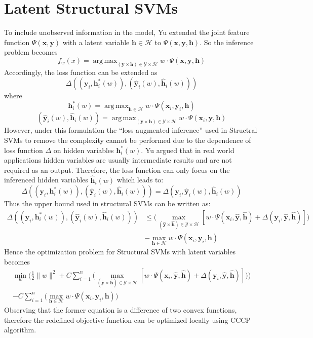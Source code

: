 \documentclass{article}
\DeclareMathOperator*{\argmax}{arg\,max}
\begin{document}
	\section{Latent Structural SVMs}
		To include unobserved information in the model, Yu\cite{yu2009learning} extended the joint feature function\cite{tsochantaridis2005large}  $\Psi(\mathbf{x},\mathbf{y}) $ with a latent variable $\mathbf{h}\in \mathcal{H}$ to $\Psi(\mathbf{x},\mathbf{y},\mathbf{h}) $. So the inference problem becomes
		$$
		f_w(x) = \argmax_{(\mathbf{y} \times \mathbf{h}) \in \mathcal{Y} \times \mathcal{H}} w\cdot\Psi(\mathbf{x},\mathbf{y},\mathbf{h})
		$$
		Accordingly, the loss function can be extended as
		$$
		\Delta((\mathbf{y}_i,\mathbf{h}^*_i(w)),(\mathbf{\hat{y}}_i(w),\mathbf{\hat{h}}_i(w)))
		$$
		where
		$$
		\mathbf{h}^*_i(w) = \argmax_{\mathbf{h} \in \mathcal{H}} w \cdot \Psi(\mathbf{x}_i,\mathbf{y}_i,\mathbf{h})
		$$
		$$
		(\mathbf{\hat{y}}_i(w),\mathbf{\hat{h}}_i(w))=\argmax_{(\mathbf{y} \times \mathbf{h}) \in \mathcal{Y} \times \mathcal{H}} w\cdot\Psi(\mathbf{x}_i,\mathbf{y},\mathbf{h})
		$$
		However, under this formulation the ``loss augmented inference'' used in Structral SVMs\cite{tsochantaridis2005large} to remove the complexity cannot be performed due to the dependence of loss function $\Delta$ on hidden variables $\mathbf{h}^*_i(w)$. Yu argued that in real world applications hidden variables are usually intermediate results and are not required as an output\cite{yu2009learning}. Therefore, the loss function can only focus on the inferenced hidden variables $\mathbf{\hat{h}}_i(w)$ which leads to:
		$$
		\Delta((\mathbf{y}_i,\mathbf{h}^*_i(w)),(\mathbf{\hat{y}}_i(w),\mathbf{\hat{h}}_i(w))) = \Delta(\mathbf{y}_i,\mathbf{\hat{y}}_i(w),\mathbf{\hat{h}}_i(w))
		$$
		Thus the upper bound used in structural SVMs can be written as:
		\begin{align}
			\label{eq:upperbound_SSVM}
			\Delta((\mathbf{y}_i,\mathbf{h}^*_i(w)),(\mathbf{\hat{y}}_i(w),\mathbf{\hat{h}}_i(w)))
			&\leq \bigg(\max_{(\mathbf{\hat{y}} \times \mathbf{\hat{h}}) \in \mathcal{Y} \times \mathcal{H}} [w\cdot\Psi(\mathbf{x}_i,\mathbf{\hat{y}},\mathbf{\hat{h}}) + \Delta(\mathbf{y}_i,\mathbf{\hat{y}},\mathbf{\hat{h}})]\bigg)\\
			&-\max_{\mathbf{h} \in \mathcal{H}} w \cdot \Psi(\mathbf{x}_i,\mathbf{y}_i,\mathbf{h})
		\end{align}
		Hence the optimization problem for Structural SVMs with latent variables becomes
		\begin{align*}
			\min_w\bigg(\frac{1}{2}\|w\|^2+
			C\sum_{i=1}^{n}\big(\max_{(\mathbf{\hat{y}} \times \mathbf{\hat{h}}) \in \mathcal{Y} \times \mathcal{H}} [w\cdot\Psi(\mathbf{x}_i,\mathbf{\hat{y}},\mathbf{\hat{h}}) + \Delta(\mathbf{y}_i,\mathbf{\hat{y}},\mathbf{\hat{h}})]\big)\bigg)\\
			-C\sum_{i=1}^{n}\big(\max_{\mathbf{h} \in \mathcal{H}} w \cdot \Psi(\mathbf{x}_i,\mathbf{y}_i,\mathbf{h})\big)
		\end{align*}
		Observing that the former equation is a difference of two convex functions, therefore the redefined objective function can be optimized locally using CCCP algorithm.
		
\end{document}
